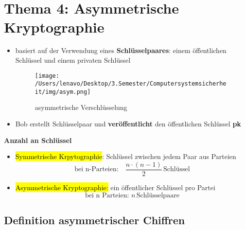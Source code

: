 \documentclass[a4paper, 10pt]{article}
\begin{document}
\section{Thema 4: Asymmetrische Kryptographie}
\begin{itemize}
    \item basiert auf der Verwendung eines \textbf{Schlüsselpaares}: einem öffentlichen Schlüssel und einem privaten Schlüssel
    \begin{figure}[h]
        \centering
        \texttt{[image: /Users/lenavo/Desktop/3.Semester/Computersystemsicherheit/img/asym.png]}
        \caption{asymmetrische Verschlüsselung}
        \label{fig:enter-label}
    \end{figure}

    \item Bob erstellt Schlüsselpaar und \textbf{veröffentlicht} den öffentlichen Schlüssel \textbf{pk}
\end{itemize}

\textbf{Anzahl an Schlüssel }
\begin{itemize}
    \item \hl{Symmetrische Krpytographie}: Schlüssel zwischen jedem Paar aus Parteien
    \[
        \text{bei n-Parteien:} \quad \frac{n \cdot (n-1)}{2} \, \text{Schlüssel}
    \]

    \item \hl{Asymmetrische Kryptographie:} ein öffentlicher Schlüssel pro Partei
    \[
        \text{bei n Parteien:} \, \, n \,  \text{Schlüsselpaare}
    \]
\end{itemize}
\newpage
\subsection{Definition asymmetrischer Chiffren}
\end{document}
